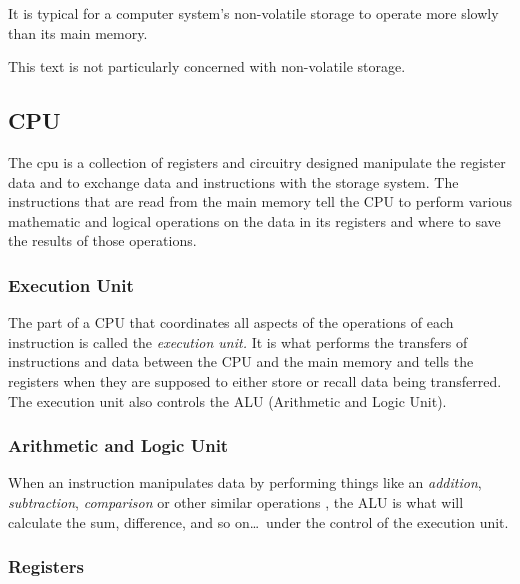 It is typical for a computer system's non-volatile storage to operate
more slowly than its main memory.

This text is not particularly concerned with non-volatile storage. 

\subsection{CPU}

The \acrshort{cpu} is a collection of registers and circuitry designed
manipulate the register data and to exchange data and instructions with the 
storage system.  The instructions that are read from the main memory tell 
the CPU to perform various mathematic and logical operations on the data 
in its registers and where to save the results of those operations.

\subsubsection{Execution Unit}

The part of a CPU that coordinates all aspects of the operations of each 
instruction is called the {\em execution unit.}  It is what performs the transfers 
of instructions and data between the CPU and the main memory and tells the 
registers when they are supposed to either store or recall data being transferred.  
The execution unit also controls the ALU (Arithmetic and Logic Unit).

\subsubsection{Arithmetic and Logic Unit}

When an instruction manipulates data by performing things like an {\em addition},
{\em subtraction}, {\em comparison} or other similar operations , the ALU is what
will calculate the sum, difference, and so on\ldots\ under the control of the 
execution unit.



\subsubsection{Registers}

